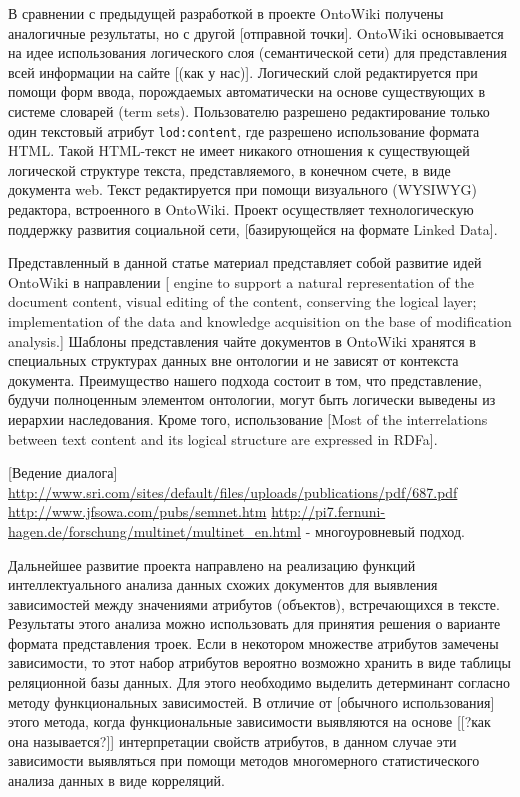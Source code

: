 \documentclass[utf8]{../IncArticle}
\newcommand{\e}[2][fcolor]{\textcolor{pcolor}{[}\textcolor{#1}{#2}\textcolor{pcolor}{]}}
\begin{document}
В сравнении с предыдущей разработкой в проекте OntoWiki \cite{b:2:14}
получены аналогичные результаты, но с другой \e{отправной точки}.
OntoWiki основывается на идее использования логического слоя
(семантической сети) для представления всей информации на сайте
\e{(как у нас)}.  Логический слой редактируется при помощи форм ввода,
порождаемых автоматически на основе существующих в системе словарей
(term sets).  Пользователю разрешено редактирование только один
текстовый атрибут \texttt{lod:content}, где разрешено использование
формата HTML.  Такой HTML-текст не имеет никакого отношения к
существующей логической структуре текста, представляемого, в конечном
счете, в виде документа web.   Текст редактируется при помощи
визуального (WYSIWYG) редактора, встроенного в OntoWiki.  Проект
осуществляет технологическую поддержку развития социальной сети,
\e{базирующейся на формате Linked Data}.

Представленный в данной статье материал представляет собой развитие
идей OntoWiki в направлении \e{
engine to support a natural representation of the document content,
visual editing of the content, conserving the logical layer;
implementation of the data and knowledge acquisition on the base of
modification analysis.}  Шаблоны представления чайте документов в
OntoWiki хранятся в специальных структурах данных вне онтологии и не
зависят от контекста документа.  Преимущество нашего подхода состоит в
том, что представление, будучи полноценным элементом онтологии, могут
быть логически выведены из иерархии наследования.  Кроме того,
использование \e{Most of the
interrelations between text content and its logical structure are
expressed in RDFa}.

\e{Ведение диалога}
\url{http://www.sri.com/sites/default/files/uploads/publications/pdf/687.pdf}
\url{http://www.jfsowa.com/pubs/semnet.htm}
\url{http://pi7.fernuni-hagen.de/forschung/multinet/multinet_en.html}
- многоуровневый подход.


Дальнейшее развитие проекта направлено на реализацию функций
интеллектуального анализа данных схожих документов для выявления
зависимостей между значениями атрибутов (объектов), встречающихся в
тексте.  Результаты этого анализа можно использовать для принятия
решения о варианте формата представления троек.  Если в некотором
множестве атрибутов замечены зависимости, то этот набор атрибутов
вероятно возможно хранить в виде таблицы реляционной базы данных.  Для
этого необходимо выделить детерминант согласно методу функциональных
зависимостей.  В отличие от \e{обычного использования} этого метода,
когда функциональные зависимости выявляются на основе \e{[?как она
  называется?]} интерпретации свойств атрибутов, в данном случае эти
зависимости выявляться при помощи методов многомерного статистического
анализа данных в виде корреляций.
\end{document}
